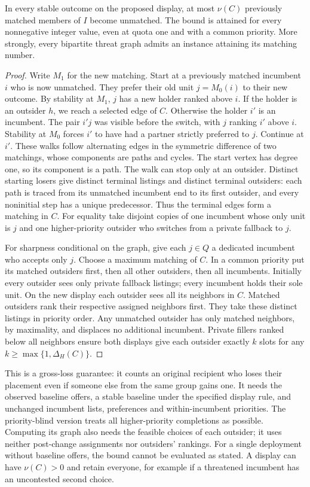 \begin{theorem}\label{thm:threat}
In every stable outcome on the proposed display, at most $\nu(C)$ previously
matched members of $I$ become unmatched. The bound is attained for every
nonnegative integer value, even at quota one and with a common priority. More
strongly, every bipartite threat graph admits an instance attaining its matching number.
\end{theorem}
\begin{proof}
Write $M_1$ for the new matching. Start at a previously matched incumbent $i$
who is now unmatched. They prefer their old unit $j=M_0(i)$ to their new outcome.
By stability at $M_1$, $j$ has a new holder ranked above $i$. If the holder is
an outsider $h$, we reach a selected edge of $C$. Otherwise the holder $i'$
is an incumbent. The pair $i'j$ was visible before the switch, with $j$ ranking
$i'$ above $i$. Stability at $M_0$ forces $i'$ to have had a partner strictly
preferred to $j$. Continue at $i'$. These walks follow alternating edges in
the symmetric difference of two matchings, whose components are paths and
cycles. The start vertex has degree one, so its component is a path. The walk
can stop only at an outsider. Distinct starting losers give distinct terminal
listings and distinct terminal outsiders: each path is traced from its unmatched
incumbent end to its first outsider, and every noninitial step has a unique
predecessor. Thus the terminal edges form a matching in $C$. For equality take
disjoint copies of one incumbent whose only unit is $j$ and one higher-priority
outsider who switches from a private fallback to $j$.

For sharpness conditional on the graph, give each $j\in Q$ a dedicated incumbent
who accepts only $j$. Choose a maximum matching of $C$. In a common priority put
its matched outsiders first, then all other outsiders, then all incumbents.
Initially every outsider sees only private fallback listings; every incumbent
holds their sole unit. On the new display each outsider sees all its neighbors in
$C$. Matched outsiders rank their respective assigned neighbors first. They take
these distinct listings in priority order. Any unmatched outsider has only
matched neighbors, by maximality, and displaces no additional incumbent.
Private fillers ranked below all neighbors ensure both displays give each
outsider exactly $k$ slots for any $k\ge\max\{1,\Delta_H(C)\}$.
\end{proof}

This is a gross-loss guarantee: it counts an original recipient who loses
their placement even if someone else from the same group gains one. It needs
the observed baseline offers, a stable baseline under the specified display
rule, and unchanged incumbent lists, preferences and within-incumbent priorities.
The priority-blind version treats all higher-priority completions as possible. Computing its graph also needs the feasible choices of each outsider;
it uses neither post-change assignments nor outsiders' rankings. For a single
deployment without baseline offers, the bound cannot be evaluated as stated.
A display can have $\nu(C)>0$ and retain everyone, for example if a threatened
incumbent has an uncontested second choice.

